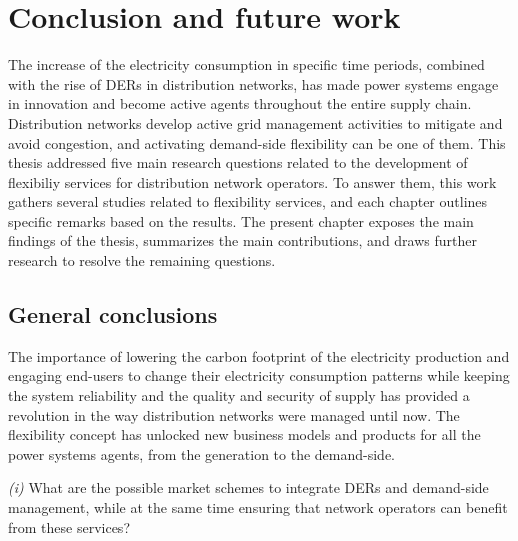 
\chapter{Conclusion and future work}
\label{conclus}
	The increase of the electricity consumption in specific time periods, combined with the rise of DERs in distribution networks, has made power systems engage in innovation and become active agents throughout the entire supply chain. Distribution networks develop active grid management activities to mitigate and avoid congestion, and activating demand-side flexibility can be one of them. 
   This thesis addressed five main research questions related to the development of flexibiliy services for distribution network operators. To answer them, this work gathers several studies related to flexibility services, and each chapter outlines specific remarks based on the results. The present chapter exposes the main findings of the thesis, summarizes the main contributions, and draws further research to resolve the remaining questions. 

\section{General conclusions}
The importance of lowering the carbon footprint of the electricity production and engaging end-users to change their electricity consumption patterns while keeping the system reliability and the quality and security of supply has provided a revolution in the way distribution networks were managed until now. The flexibility concept has unlocked new business models and products for all the power systems agents, from the generation to the demand-side.


\begin{tcolorbox}
\textit{(i)} What are the possible market schemes to integrate DERs and demand-side management, while at the same time ensuring that network operators can benefit from these services?  
\end{tcolorbox}

